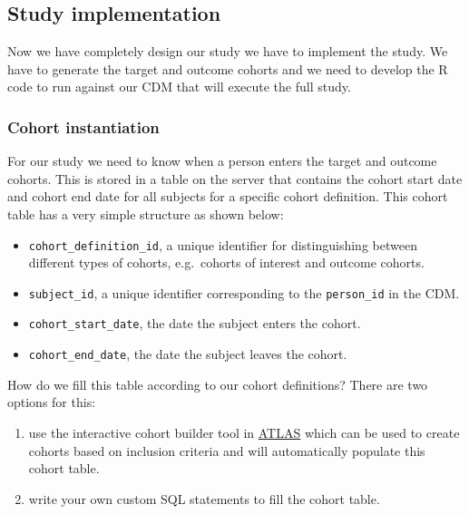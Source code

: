 \documentclass[
]{article}
\providecommand{\tightlist}{%
  \setlength{\itemsep}{0pt}\setlength{\parskip}{0pt}}
\begin{document}
\hypertarget{study-implementation-1}{%
\subsection{Study implementation}\label{study-implementation-1}}

Now we have completely design our study we have to implement the study.
We have to generate the target and outcome cohorts and we need to
develop the R code to run against our CDM that will execute the full
study.

\hypertarget{cohort-instantiation-1}{%
\subsubsection{Cohort instantiation}\label{cohort-instantiation-1}}

For our study we need to know when a person enters the target and
outcome cohorts. This is stored in a table on the server that contains
the cohort start date and cohort end date for all subjects for a
specific cohort definition. This cohort table has a very simple
structure as shown below:

\begin{itemize}
\tightlist
\item
  \texttt{cohort\_definition\_id}, a unique identifier for
  distinguishing between different types of cohorts, e.g.~cohorts of
  interest and outcome cohorts.
\item
  \texttt{subject\_id}, a unique identifier corresponding to the
  \texttt{person\_id} in the CDM.
\item
  \texttt{cohort\_start\_date}, the date the subject enters the cohort.
\item
  \texttt{cohort\_end\_date}, the date the subject leaves the cohort.
\end{itemize}

How do we fill this table according to our cohort definitions? There are
two options for this:

\begin{enumerate}
\def\labelenumi{\arabic{enumi})}
\item
  use the interactive cohort builder tool in
  \href{www.github.com/OHDSI/ATLAS}{ATLAS} which can be used to create
  cohorts based on inclusion criteria and will automatically populate
  this cohort table.
\item
  write your own custom SQL statements to fill the cohort table.
\end{enumerate}
\end{document}

